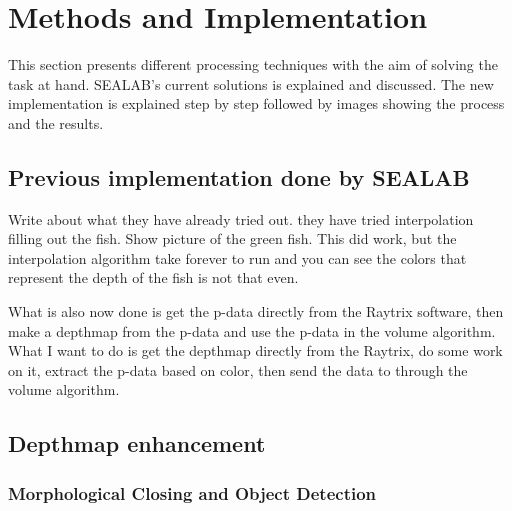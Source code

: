 \section{Methods and Implementation}\label{methods and implementation}

This section presents different processing techniques with the aim of solving the task at hand. SEALAB's current solutions is explained and discussed. The new implementation is explained step by step followed by images showing the process and the results.


\subsection{Previous implementation done by SEALAB}

{\color{red}
Write about what they have already tried out. 
they have tried interpolation filling out the fish. Show picture of the green fish. 
This did work, but the interpolation algorithm take forever to run and you can see the colors that represent the depth of the fish is not that even.

What is also now done is get the p-data directly from the Raytrix software, then make a depthmap from the p-data and use the p-data in the volume algorithm. What I want to do is get the depthmap directly from the Raytrix, do some work on it, extract the p-data based on color, then send the data to through the volume algorithm. 
}



\subsection{Depthmap enhancement} \label{section:depthmap}

\subsubsection{Morphological Closing and Object Detection}

